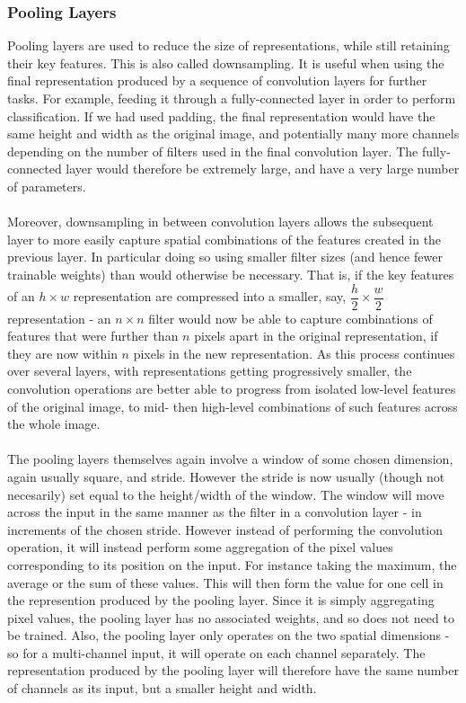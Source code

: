 \documentclass[11pt]{article} %
\theoremstyle{plain}
\theoremstyle{definition}
\begin{document}
\subsubsection{Pooling Layers}
Pooling layers are used to reduce the size of representations, while still retaining their key features. This is also called downsampling. It is useful when using the final representation produced by a sequence of convolution layers for further tasks. For example, feeding it through a fully-connected layer in order to perform classification. If we had used padding, the final representation would have the same height and width as the original image, and potentially many more channels depending on the number of filters used in the final convolution layer. The fully-connected layer would therefore be extremely large, and have a very large number of parameters.   
\\
\\
\noindent
Moreover, downsampling in between convolution layers allows the subsequent layer to more easily capture spatial combinations of the features created in the previous layer. In particular doing so using smaller filter sizes (and hence fewer trainable weights) than would otherwise be necessary. That is, if the key features of an \(h \times w\) representation are compressed into a smaller, say, \(\dfrac{h}{2} \times \dfrac{w}{2}\) representation - an \(n \times n\) filter would now be able to capture combinations of features that were further than \(n\) pixels apart in the original representation, if they are now within \(n\) pixels in the new representation. As this process continues over several layers, with representations getting progressively smaller, the convolution operations are better able to progress from isolated low-level features of the original image, to mid- then high-level combinations of such features across the whole image.
\\
\\
\noindent
The pooling layers themselves again involve a window of some chosen dimension, again usually square, and stride. However the stride is now usually (though not necesarily) set equal to the height/width of the window. The window will move across the input in the same manner as the filter in a convolution layer - in increments of the chosen stride. However instead of performing the convolution operation, it will instead perform some aggregation of the pixel values corresponding to its position on the input. For instance taking the maximum, the average or the sum of these values. This will then form the value for one cell in the represention produced by the pooling layer. Since it is simply aggregating pixel values, the pooling layer has no associated weights, and so does not need to be trained. Also, the pooling layer only operates on the two spatial dimensions - so for a multi-channel input, it will operate on each channel separately. The representation produced by the pooling layer will therefore have the same number of channels as its input, but a smaller height and width.
\end{document}
